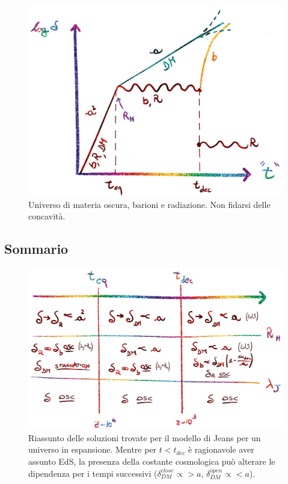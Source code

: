\begin{figure}[ht]
    \centering
    \includegraphics[width=.9 \textwidth]{Pictures/6/dmgrowingfactor.jpg}
    \caption{Universo di materia oscura, barioni e radiazione. Non fidarsi delle concavità.}
\end{figure}


\subsection{Sommario}

\begin{figure}[H]
    \centering
    \includegraphics[width=\textwidth]{Pictures/6/sommario.jpg}
    \caption{Riassunto delle soluzioni trovate per il modello di Jeans per un universo in espansione. Mentre per $t<t_{dec}$ è ragionavole aver assunto EdS, la presenza della costante cosmologica può alterare le dipendenza per i tempi successivi ($\delta_{DM}^{close}\propto > a$, $\delta_{DM}^{open}\propto < a$). }
\end{figure}